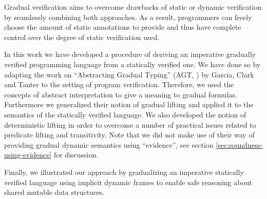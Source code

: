 Gradual verification aims to overcome drawbacks of static or dynamic verification by seamlessly combining both approaches.
As a result, programmers can freely choose the amount of static annotations to provide and thus have complete control over the degree of static verification used.

In this work we have developed a procedure of deriving an imperative gradually verified programming language from a statically verified one.
We have done so by adapting the work on “Abstracting Gradual Typing” (AGT, \cite{garcia2016abstracting}) by Garcia, Clark and Tanter to the setting of program verification.
Therefore, we used the concepts of abstract interpretation to give a meaning to gradual formulas.
Furthermore we generalized their notion of gradual lifting and applied it to the semantics of the statically verified language.
We also developed the notion of deterministic lifting in order to overcome a number of practical issues related to predicate lifting and transitivity.
Note that we did not make use of their way of providing gradual dynamic semantics using “evidence”, see section \ref{sec:soundness-using-evidence} for discussion.

Finally, we illustrated our approach by gradualizing an imperative statically verified language using implicit dynamic frames to enable safe reasoning about shared mutable data structures.




